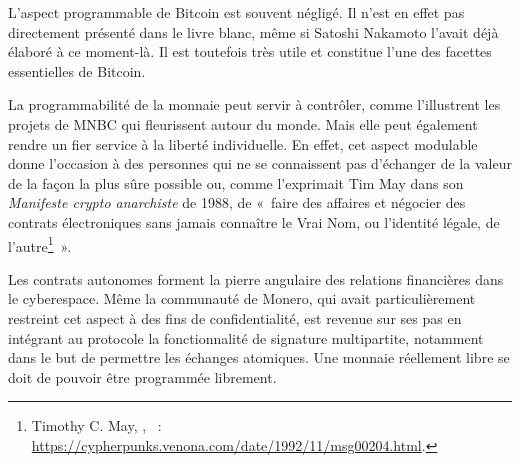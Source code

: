 L'aspect programmable de Bitcoin est souvent négligé. Il n'est en effet pas directement présenté dans le livre blanc, même si Satoshi Nakamoto l'avait déjà élaboré à ce moment-là. Il est toutefois très utile et constitue l'une des facettes essentielles de Bitcoin.

La programmabilité de la monnaie peut servir à contrôler, comme l'illustrent les projets de MNBC qui fleurissent autour du monde. Mais elle peut également rendre un fier service à la liberté individuelle. En effet, cet aspect modulable donne l'occasion à des personnes qui ne se connaissent pas d'échanger de la valeur de la façon la plus sûre possible ou, comme l'exprimait Tim May dans son \emph{Manifeste crypto anarchiste} de 1988, de «~faire des affaires et négocier des contrats électroniques sans jamais connaître le Vrai Nom, ou l'identité légale, de l'autre\footnote{Timothy C. May, , ~: \url{https://cypherpunks.venona.com/date/1992/11/msg00204.html}.}~».

Les contrats autonomes forment la pierre angulaire des relations financières dans le cyberespace. Même la communauté de Monero, qui avait particulièrement restreint cet aspect à des fins de confidentialité, est revenue sur ses pas en intégrant au protocole la fonctionnalité de signature multipartite, notamment dans le but de permettre les échanges atomiques. Une monnaie réellement libre se doit de pouvoir être programmée librement.
